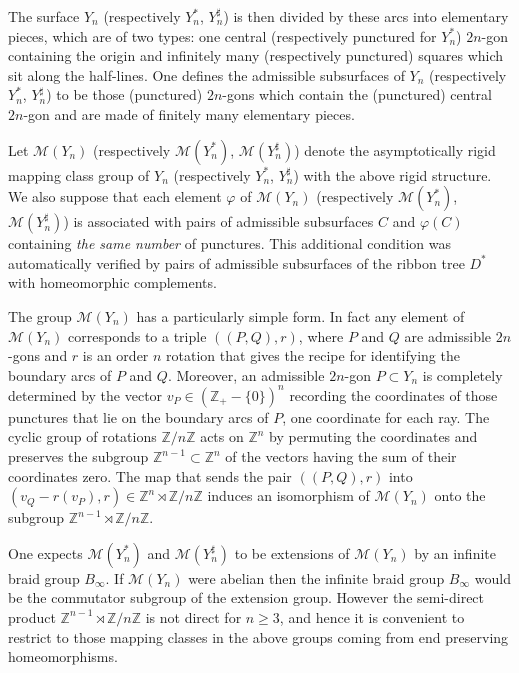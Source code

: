 \documentclass[twoside]{irmaems}
\theoremstyle{plain}
\theoremstyle{definition}
\theoremstyle{remark}
\newcommand{\Z}{{\mathbb{Z}}}
\begin{document}
\vspace{0.2cm}
\noindent
The surface $Y_n$ (respectively $Y_n^*$, $Y_n^{\sharp}$) is then divided by these arcs 
into elementary pieces, which are of two types: 
one central  (respectively punctured for $Y_n^*$) $2n$-gon  containing the  
origin and infinitely many (respectively punctured) 
squares which sit along the half-lines. 
One defines the admissible subsurfaces of $Y_n$ (respectively  $Y_n^*$, 
$Y_n^{\sharp}$)  
to be those (punctured)  $2n$-gons which contain the 
(punctured)  central $2n$-gon and are made of finitely many elementary 
pieces.   

\vspace{0.2cm}
\noindent
Let ${\mathcal M}(Y_n)$ (respectively ${\mathcal M}(Y_n^*)$, 
${\mathcal M}(Y_n^{\sharp})$) 
denote the asymptotically rigid mapping class 
group of $Y_n$ (respectively $Y_n^*$, $Y_n^{\sharp}$) with the above rigid structure. We also suppose that each element $\varphi$ of ${\mathcal M}(Y_n)$ 
(respectively ${\mathcal M}(Y_n^*)$, ${\mathcal M}(Y_n^{\sharp})$) 
is associated with pairs of admissible subsurfaces $C$ and $\varphi(C)$ 
containing {\it the same number} of punctures. 
This additional condition was automatically verified by 
pairs of admissible subsurfaces of the ribbon tree $D^*$ with homeomorphic 
complements. 


\vspace{0.2cm}
\noindent
The group ${\mathcal M}(Y_n)$ has a particularly simple form. 
In fact any element of  ${\mathcal M}(Y_n)$ corresponds to a triple  
$((P,Q), r)$, where $P$ and $Q$ are admissible $2n$-gons and 
$r$ is an order $n$ rotation that gives the recipe for identifying the 
boundary arcs of $P$ and $Q$. Moreover, an admissible $2n$-gon $P\subset Y_n$ 
is completely determined by the vector  $v_P\in (\Z_+-\{0\})^n$ recording 
the coordinates of those punctures that lie on the boundary arcs 
of $P$, one coordinate for each ray. 
The cyclic group of rotations $\Z/n\Z$
acts on $\Z^n$ by permuting the coordinates and preserves the 
subgroup  $\Z^{n-1}\subset \Z^n$ of the vectors having the sum of 
their coordinates zero. The map that sends 
the pair $((P,Q),r)$ into $(v_Q-r(v_P), r)\in \Z^n\rtimes \Z/n\Z$ 
induces an isomorphism of  
${\mathcal M}(Y_n)$ onto the subgroup $\Z^{n-1}\rtimes \Z/n\Z$. 


\vspace{0.2cm}
\noindent 
One expects ${\mathcal M}(Y_n^*)$ and 
${\mathcal M}(Y_n^{\sharp})$ to be  
extensions of ${\mathcal M}(Y_n)$ by an infinite braid group $B_{\infty}$. 
If ${\mathcal M}(Y_n)$ were abelian then the infinite braid  group 
$B_{\infty}$ would be the commutator  subgroup of the extension group. 
However the semi-direct product $\Z^{n-1}\rtimes \Z/n\Z$ is not direct 
for $n\geq 3$, and hence it is convenient to restrict 
to those  mapping classes in the above groups coming from 
end preserving homeomorphisms. 
\end{document}
